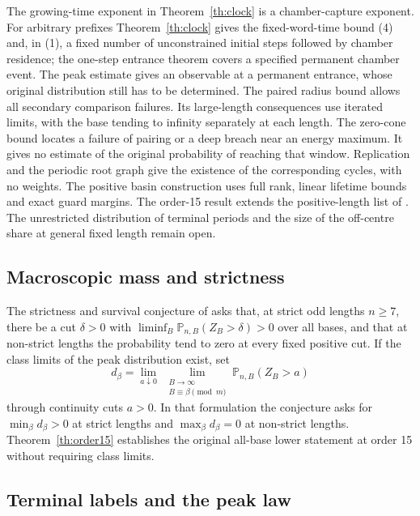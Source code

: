 \documentclass[11pt]{amsart}
\theoremstyle{definition}
\newcommand{\PP}{\mathbb P}
\begin{document}
The growing-time exponent in Theorem~\ref{th:clock}
is a chamber-capture exponent. For arbitrary prefixes
Theorem~\ref{th:clock} gives the fixed-word-time bound (4) and, in (1),
a fixed number of unconstrained initial steps followed by chamber
residence; the one-step entrance theorem covers a specified permanent
chamber event. The
peak estimate gives an observable at a permanent entrance,
whose original distribution still has to be determined.
The paired radius bound allows all secondary comparison
failures. Its large-length consequences use iterated
limits, with the base tending to infinity separately at
each length. The zero-cone bound locates a failure of
pairing or a deep breach near an energy maximum. It gives
no estimate of the original probability of reaching that
window. Replication and the periodic root graph give the
existence of the corresponding cycles, with no weights. The positive
basin construction uses full rank, linear lifetime bounds and exact
guard margins. The order-15 result extends the positive-length list of
\cite{G9}. The unrestricted distribution of terminal periods and the
size of the off-centre share at general fixed length remain open.

\subsection*{Macroscopic mass and strictness}

The strictness and survival conjecture of \cite[Section~7]{G10}
asks that, at strict odd lengths \(n\ge7\), there be a cut
\(\delta>0\) with \(\liminf_B\PP_{n,B}(Z_B>\delta)>0\) over
all bases, and that at non-strict lengths the probability
tend to zero at every fixed positive cut.
If the class limits of the peak distribution exist, set
\[
 d_\beta=\lim_{a\downarrow0}\ 
  \lim_{\substack{B\to\infty\\B\equiv\beta\pmod m}}
  \PP_{n,B}(Z_B>a)
\]
through continuity cuts \(a>0\). In that formulation the
conjecture asks for \(\min_\beta d_\beta>0\) at strict
lengths and \(\max_\beta d_\beta=0\) at non-strict lengths.
Theorem~\ref{th:order15} establishes the original all-base
lower statement at order 15 without requiring class limits.

\subsection*{Terminal labels and the peak law}
\end{document}
